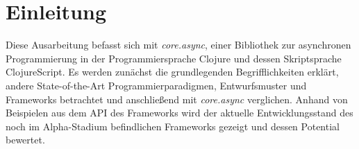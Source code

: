 \chapter{Einleitung}
Diese Ausarbeitung befasst sich mit \textit{core.async}, einer Bibliothek zur asynchronen Programmierung in der Programmiersprache Clojure und dessen Skriptsprache ClojureScript. Es werden zunächst die grundlegenden Begrifflichkeiten erklärt, andere State-of-the-Art Programmierparadigmen, Entwurfsmuster und Frameworks betrachtet und anschließend mit \textit{core.async} verglichen. Anhand von Beispielen aus dem \acf{API} des Frameworks wird der aktuelle Entwicklungsstand des noch im Alpha-Stadium befindlichen Frameworks gezeigt und dessen Potential bewertet.

\acresetall